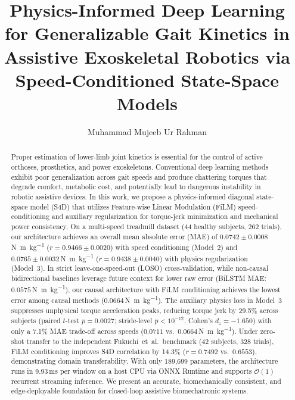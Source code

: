\documentclass[fleqn,10pt]{wlscirep}
\title{Physics-Informed Deep Learning for Generalizable Gait Kinetics in Assistive Exoskeletal Robotics via Speed-Conditioned State-Space Models}
\author[1,*]{Muhammad Mujeeb Ur Rahman}
\affil[1]{Independent Researcher in Biomedical Artificial Intelligence and Biomechatronic Systems, Islamabad, Pakistan}
\affil[*]{e-mail: mujeebbadwan1155@gmail.com}
\newcommand{\Nmskg}{\si{\newton\metre\per\kilogram}}
\begin{document}
\flushbottom

\begin{abstract}
Proper estimation of lower-limb joint kinetics is essential for the control of active orthoses, prosthetics, and power exoskeletons. Conventional deep learning methods exhibit poor generalization across gait speeds and produce chattering torques that degrade comfort, metabolic cost, and potentially lead to dangerous instability in robotic assistive devices. In this work, we propose a physics-informed diagonal state-space model (S4D) that utilizes Feature-wise Linear Modulation (FiLM) speed-conditioning and auxiliary regularization for torque-jerk minimization and mechanical power consistency. On a multi-speed treadmill dataset (44 healthy subjects, 262 trials), our architecture achieves an overall mean absolute error (MAE) of $0.0742 \pm 0.0008$\,\Nmskg{} ($r = 0.9466 \pm 0.0020$) with speed conditioning (Model~2) and $0.0765 \pm 0.0032$\,\Nmskg{} ($r = 0.9438 \pm 0.0040$) with physics regularization (Model~3). In strict leave-one-speed-out (LOSO) cross-validation, while non-causal bidirectional baselines leverage future context for lower raw error (BiLSTM MAE: $0.0575$\,\Nmskg{}), our causal architecture with FiLM conditioning achieves the lowest error among causal methods ($0.0664$\,\Nmskg{}). The auxiliary physics loss in Model~3 suppresses unphysical torque acceleration peaks, reducing torque jerk by 29.5\% across subjects (paired $t$-test $p = 0.0027$; stride-level $p < 10^{-12}$, Cohen's $d_z = -1.650$) with only a 7.1\% MAE trade-off across speeds ($0.0711$ vs.\ $0.0664$\,\Nmskg{}). Under zero-shot transfer to the independent Fukuchi~et~al.\ benchmark (42 subjects, 328 trials), FiLM conditioning improves S4D correlation by 14.3\% ($r = 0.7492$ vs.\ $0.6553$), demonstrating domain transferability. With only 189,699 parameters, the architecture runs in 9.93\,ms per window on a host CPU via ONNX Runtime and supports $\mathcal{O}(1)$ recurrent streaming inference. We present an accurate, biomechanically consistent, and edge-deployable foundation for closed-loop assistive biomechatronic systems.
\end{abstract}

\maketitle
\thispagestyle{empty}
\end{document}
